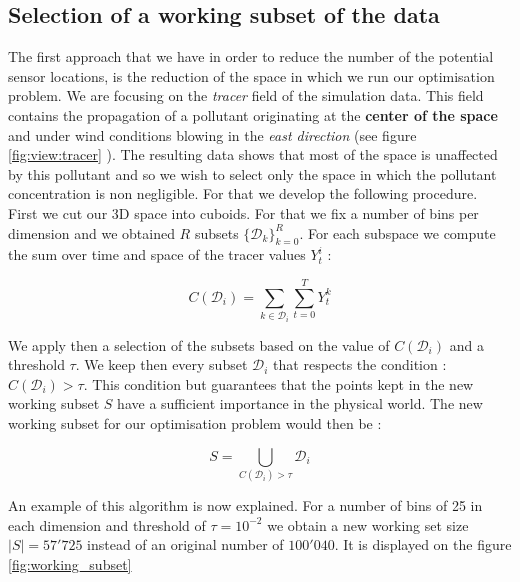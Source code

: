 \subsection{Selection of a working subset of the data}
The first approach that we have in order to reduce the number of the potential sensor locations, is the reduction of the space in which  we run our optimisation problem. We are focusing on the \textit{tracer} field of the simulation data. This field contains the propagation of a pollutant originating at the \textbf{center of the space} and under wind conditions blowing in the \textit{east direction} (see figure \ref{fig:view:tracer} ). The resulting data shows that most of the space is unaffected by this pollutant and so we wish to select only the space in which the pollutant concentration is non negligible. For that we develop the following procedure. \\

First we cut our 3D space into cuboids. For that we fix a number of bins per dimension and we obtained $R$ subsets $\{\mathcal{D}_k\}_{k=0}^R $. For each subspace we compute the sum over time and space of the tracer values $Y_t^i$  : 

\begin{equation}
	C(\mathcal{D}_i) = \sum_{k \in \mathcal{D}_i} \sum_{t = 0}^T Y_t^k
\end{equation}

We apply then a selection of the subsets based on the value of $C(\mathcal{D}_i)$ and a  threshold $\tau$. We keep then every subset $\mathcal{D}_i$ that respects the condition : $C(\mathcal{D}_i) > \tau$. This condition but guarantees that the points kept in the new working subset $S$ have a sufficient importance in the physical world. The new working subset for our optimisation problem would then be : 

\begin{equation}
	S = \bigcup_{C(\mathcal{D}_i) > \tau} \mathcal{D}_i
\end{equation} 

An example of this algorithm is now explained. For a number of bins of 25 in each dimension and threshold of $\tau = 10^{-2}$ we obtain a new working set size $|S| = 57'725$ instead of an original number of $100'040$. It is displayed on the figure \ref{fig:working_subset}


